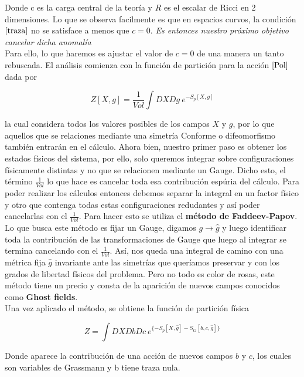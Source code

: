 \documentclass[]{article}
\begin{document}
Donde c es la carga central de la teoría y $ R $ es el escalar de Ricci en 2 dimensiones. Lo que se observa facilmente es que en espacios curvos, la condición
$ \ref{traza} $ no se satisface a menos que $ c=0 $. \textit{Es entonces nuestro próximo objetivo cancelar dicha anomalía}\\

Para ello, lo que haremos es ajustar el valor de $ c=0 $ de una manera un tanto rebuscada. El análisis comienza con la función de partición para la acción $ \ref{Pol} $ dada por

\begin{equation}\label{key}
Z[X,g]=\frac{1}{Vol}\int DXDg \ e^{-S_p[X,g]}
\end{equation} 

\noindent la cual considera todos los valores posibles de los campos $ X $ y $ g $, por lo que aquellos que se relaciones mediante una simetría Conforme o difeomorfismo también entrarán en el cálculo. Ahora bien, nuestro primer paso es obtener los estados físicos del sistema, por ello, solo queremos integrar sobre configuraciones físicamente distintas y no que se relacionen mediante un Gauge. Dicho esto, el término $ \frac{1}{Vol} $ lo que hace es cancelar toda esa contribución espúria del cálculo. Para poder realizar los cálculos entonces debemos separar la integral en un factor físico y otro que contenga todas estas configuraciones redudantes y así poder cancelarlas con el  $ \frac{1}{Vol} $. Para hacer esto se utiliza el \textbf{método de Faddeev-Papov}. Lo que busca este método es fijar un Gauge, digamos $g \rightarrow \hat{g}$ y luego identificar toda la contribución de las transformaciones de Gauge que luego al integrar se termina cancelando con el $ \frac{1}{Vol} $. Así, nos queda una integral de camino con una métrica fija $ \hat{g} $ invariante ante las simetrías que queríamos preservar y con los grados de libertad físicos del problema. Pero no todo es color de rosas, este método tiene un precio y consta de la aparición de nuevos campos conocidos como \textbf{Ghost fields}.\\

\noindent Una vez aplicado el método, se obtiene la función de partición física

\begin{equation}\label{Zfis}
Z=\int DX Db Dc \ e^{\{-S_p[X,\hat{g}]-S_G[b,c,\hat{g}]\}}
\end{equation}

Donde aparece la contribución de una acción de nuevos campos $ b $ y $ c $, los cuales son variables de Grassmann y b tiene traza nula.
\end{document}
